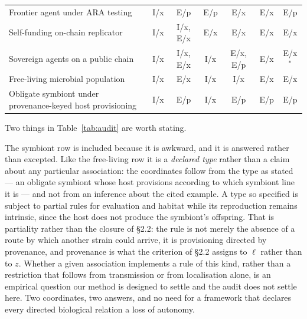 \documentclass[review,3p,times]{elsarticle}
\begin{document}
\begin{table}[ht]
\begin{tabular}{lcccccc}
Frontier agent under ARA testing & I/x & E/p        & E/p & E/x & E/x & E/p\\
Self-funding on-chain replicator & I/x & I/x, E/x   & E/x & E/x & E/x & E/x\\
Sovereign agents on a public chain & I/x & I/x, E/x & I/x & E/x, E/p & E/x & E/x$^{*}$\\
\midrule
Free-living microbial population & I/x & E/x        & I/x & I/x & E/x & E/x\\
Obligate symbiont under provenance-keyed host provisioning & I/x & E/p & I/x & E/p & E/p & E/p\\
\bottomrule
\end{tabular}
\end{table}

Two things in Table~\ref{tab:audit} are worth stating.

The symbiont row is included because it is awkward, and it is answered rather
than excepted. Like the free-living row it is a \emph{declared type} rather
than a claim about any particular association: the coordinates follow from the
type as stated --- an obligate symbiont whose host provisions according to
which symbiont line it is --- and not from an inference about the cited
example. A type so specified is subject to partial rules for evaluation and
habitat while its reproduction remains intrinsic, since the host does not
produce the symbiont's offspring. That is partiality rather than the closure
of \S2.2: the rule is not merely the absence of a route by which another
strain could arrive, it is provisioning directed by provenance, and provenance
is what the criterion of \S2.2 assigns to $\ell$ rather than to $z$. Whether a
given association implements a rule of this kind, rather than a restriction
that follows from transmission or from localisation alone, is an empirical
question our method is designed to settle and the audit does not settle here.
Two coordinates, two answers, and no need for a framework that declares every
directed biological relation a loss of autonomy.
\end{document}
